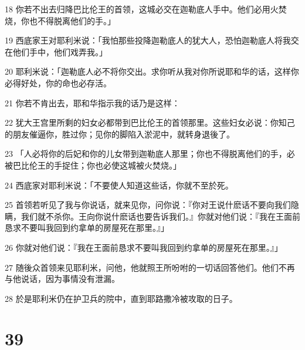 \par 18 你若不出去归降巴比伦王的首领，这城必交在迦勒底人手中。他们必用火焚烧，你也不得脱离他们的手。」
\par 19 西底家王对耶利米说：「我怕那些投降迦勒底人的犹大人，恐怕迦勒底人将我交在他们手中，他们戏弄我。」
\par 20 耶利米说：「迦勒底人必不将你交出。求你听从我对你所说耶和华的话，这样你必得好处，你的命也必存活。
\par 21 你若不肯出去，耶和华指示我的话乃是这样：
\par 22 犹大王宫里所剩的妇女必都带到巴比伦王的首领那里。这些妇女必说：你知己的朋友催逼你，胜过你；见你的脚陷入淤泥中，就转身退後了。
\par 23 「人必将你的后妃和你的儿女带到迦勒底人那里；你也不得脱离他们的手，必被巴比伦王的手捉住；你也必使这城被火焚烧。」
\par 24 西底家对耶利米说：「不要使人知道这些话，你就不至於死。
\par 25 首领若听见了我与你说话，就来见你，问你说：『你对王说什麽话不要向我们隐瞒，我们就不杀你。王向你说什麽话也要告诉我们。』你就对他们说：『我在王面前恳求不要叫我回到约拿单的房屋死在那里。』」
\par 26 你就对他们说：『我在王面前恳求不要叫我回到约拿单的房屋死在那里。』」
\par 27 随後众首领来见耶利米，问他，他就照王所吩咐的一切话回答他们。他们不再与他说话，因为事情没有泄漏。
\par 28 於是耶利米仍在护卫兵的院中，直到耶路撒冷被攻取的日子。

\chapter{39}

